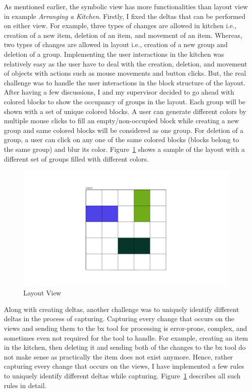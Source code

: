 As mentioned earlier, the symbolic view has more functionalities than layout view in example \textit{Arranging a Kitchen}. Firstly, I fixed the deltas that can be performed on either view. For example, three types of changes are allowed in kitchen i.e., creation of a new item, deletion of an item, and movement of an item. Whereas, two types of changes are allowed in layout i.e., creation of a new group and deletion of a group. Implementing the user interactions in the kitchen was relatively easy as the user have to deal with the creation, deletion, and movement of objects with actions such as mouse movements and button clicks. But, the real challenge was to handle the user interactions in the block structure of the layout. After having a few discussions, I and my supervisor decided to go ahead with colored blocks to show the occupancy of groups in the layout. Each group will be shown with a set of unique colored blocks. A user can generate different colors by multiple mouse clicks to fill an empty/non-occupied block while creating a new group and same colored blocks will be considered as one group. For deletion of a group, a user can click on any one of the same colored blocks (blocks belong to the same group) and blur its color. Figure~\ref{fig:Layout} shows a sample of the layout with a different set of groups filled with different colors.

\begin{figure}
	\includegraphics[width=1\textwidth]{figures/layout}
	\caption{Layout View}
	\label{fig:Layout}
\end{figure}

Along with creating deltas, another challenge was to uniquely identify different deltas in the process of capturing. Capturing every change that occurs on the views and sending them to the bx tool for processing is error-prone, complex, and sometimes even not required for the tool to handle. For example, creating an item in the kitchen, then deleting it and sending both of the changes to the bx tool do not make sense as practically the item does not exist anymore. Hence, rather capturing every change that occurs on the views, I have implemented a few rules to uniquely identify different deltas while capturing. Figure~\ref{fig:Layout} describes all such rules in detail.


